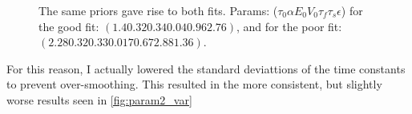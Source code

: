 \begin{figure}
\caption{The same priors gave rise to both fits. Params: ($\tau_0 \alpha E_0 V_0 \tau_f \tau_s \epsilon$)
for the good fit: $(1.40 .32 0.34 0.04  0.96 2.76)$, and for the poor fit:
$(2.28 0.32 0.33 0.017 0.67 2.88 1.36)$.}
\label{fig:badfit_param1}
\end{figure}

For this reason, I actually lowered the standard deviattions of the time
constants to prevent over-smoothing. This resulted in the more consistent, but
slightly worse results seen in \autoref{fig:param2_var}

